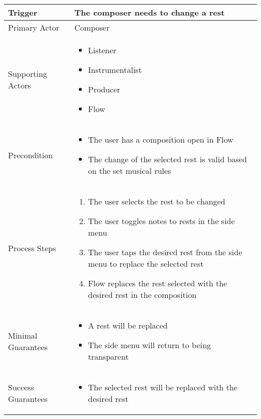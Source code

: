 \begin{longtable}{|X|X|}
\hline
Trigger & 
The composer needs to change a rest \\
\hline
Primary Actor & 
Composer\\
\hline
Supporting Actors & 
\begin{itemize}
\item Listener
\item Instrumentalist
\item Producer
\item Flow
\end{itemize} \\
\hline
Precondition & 
\begin{itemize}
\item The user has a composition open in Flow  
\item The change of the selected rest is valid based on the set musical rules
\end{itemize} \\
\hline
Process Steps & 
\begin{enumerate}
\item The user selects the rest to be changed 
\item The user toggles notes to rests in the side menu
\item The user taps the desired rest from the side menu to replace the selected rest
\item Flow replaces the rest selected with the desired rest in the composition
\end{enumerate} \\
\hline
Minimal Guarantees & 
\begin{itemize}
  \item A rest will be replaced
  \item The side menu will return to being transparent
\end{itemize} \\
\hline
Success Guarantees & 
\begin{itemize}
  \item The selected rest will be replaced with the desired rest
\end{itemize} \\
\hline
\end{longtable}